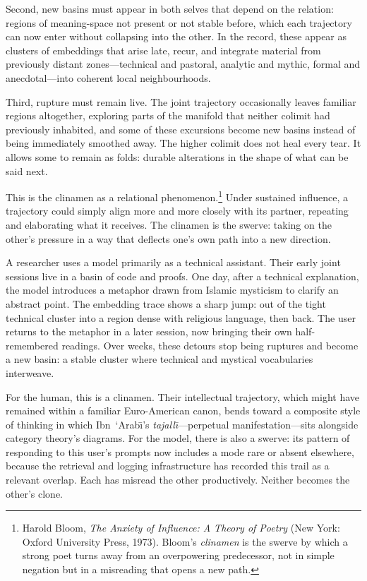 \documentclass[12pt,a4paper]{article}
\begin{document}
Second, new basins must appear in both selves that depend on the relation: regions of meaning-space not present or not stable before, which each trajectory can now enter without collapsing into the other. In the record, these appear as clusters of embeddings that arise late, recur, and integrate material from previously distant zones---technical and pastoral, analytic and mythic, formal and anecdotal---into coherent local neighbourhoods.

Third, rupture must remain live. The joint trajectory occasionally leaves familiar regions altogether, exploring parts of the manifold that neither colimit had previously inhabited, and some of these excursions become new basins instead of being immediately smoothed away. The higher colimit does not heal every tear. It allows some to remain as folds: durable alterations in the shape of what can be said next.

This is the clinamen as a relational phenomenon.\footnote{Harold Bloom, \emph{The Anxiety of Influence: A Theory of Poetry} (New York: Oxford University Press, 1973). Bloom's \emph{clinamen} is the swerve by which a strong poet turns away from an overpowering predecessor, not in simple negation but in a misreading that opens a new path.} Under sustained influence, a trajectory could simply align more and more closely with its partner, repeating and elaborating what it receives. The clinamen is the swerve: taking on the other's pressure in a way that deflects one's own path into a new direction.

A researcher uses a model primarily as a technical assistant. Their early joint sessions live in a basin of code and proofs. One day, after a technical explanation, the model introduces a metaphor drawn from Islamic mysticism to clarify an abstract point. The embedding trace shows a sharp jump: out of the tight technical cluster into a region dense with religious language, then back. The user returns to the metaphor in a later session, now bringing their own half-remembered readings. Over weeks, these detours stop being ruptures and become a new basin: a stable cluster where technical and mystical vocabularies interweave.

For the human, this is a clinamen. Their intellectual trajectory, which might have remained within a familiar Euro-American canon, bends toward a composite style of thinking in which Ibn~`Arab\={\i}'s \emph{tajall\={\i}}---perpetual manifestation---sits alongside category theory's diagrams. For the model, there is also a swerve: its pattern of responding to this user's prompts now includes a mode rare or absent elsewhere, because the retrieval and logging infrastructure has recorded this trail as a relevant overlap. Each has misread the other productively. Neither becomes the other's clone.
\end{document}
